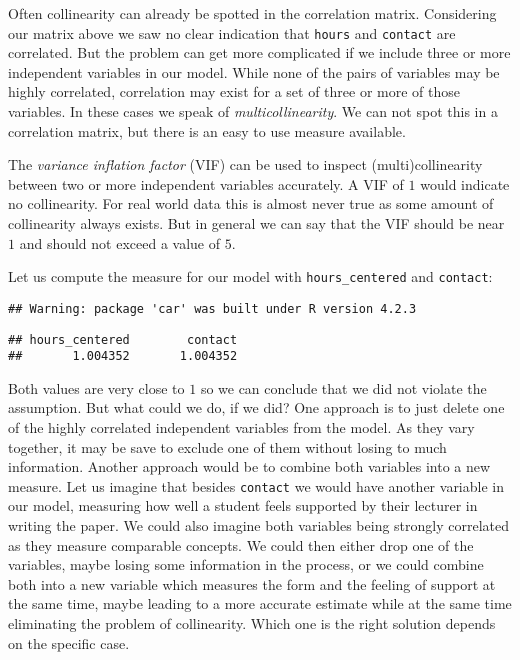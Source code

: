 \documentclass[
]{book}
\begin{document}
Often collinearity can already be spotted in the correlation matrix. Considering
our matrix above we saw no clear indication that \texttt{hours} and \texttt{contact} are
correlated. But the problem can get more complicated if we include three or more
independent variables in our model. While none of the pairs of variables may be
highly correlated, correlation may exist for a set of three or more of those
variables. In these cases we speak of \emph{multicollinearity}. We can not spot this
in a correlation matrix, but there is an easy to use measure available.

The \emph{variance inflation factor} (VIF) can be used to inspect (multi)collinearity
between two or more independent variables accurately. A VIF of \(1\) would
indicate no collinearity. For real world data this is almost never true as some
amount of collinearity always exists. But in general we can say that the VIF
should be near \(1\) and should not exceed a value of \(5\).

Let us compute the measure for our model with \texttt{hours\_centered} and \texttt{contact}:

\begin{verbatim}
## Warning: package 'car' was built under R version 4.2.3
\end{verbatim}

\begin{verbatim}
## hours_centered        contact 
##       1.004352       1.004352
\end{verbatim}

Both values are very close to \(1\) so we can conclude that we did not violate
the assumption. But what could we do, if we did? One approach is to just delete
one of the highly correlated independent variables from the model. As they vary
together, it may be save to exclude one of them without losing to much
information. Another approach would be to combine both variables into a new
measure. Let us imagine that besides \texttt{contact} we would have another variable in
our model, measuring how well a student feels supported by their lecturer in
writing the paper. We could also imagine both variables being strongly
correlated as they measure comparable concepts. We could then either drop one of
the variables, maybe losing some information in the process, or we could combine
both into a new variable which measures the form and the feeling of support at
the same time, maybe leading to a more accurate estimate while at the same time
eliminating the problem of collinearity. Which one is the right solution
depends on the specific case.
\end{document}
